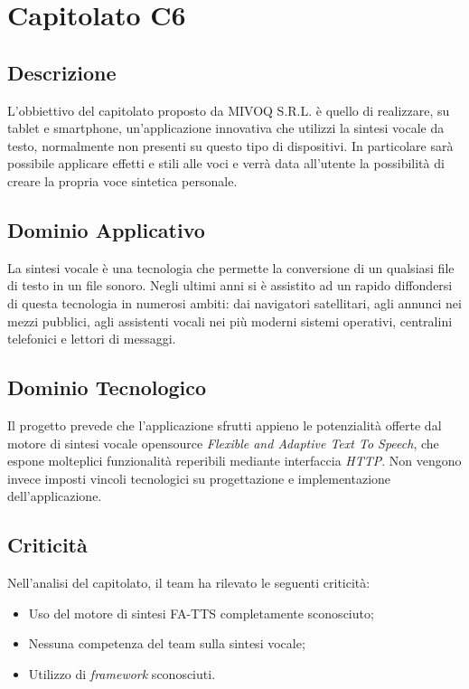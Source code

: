 \newpage
\section{Capitolato C6}
\subsection{Descrizione}
L’obbiettivo del capitolato proposto da MIVOQ S.R.L. è quello di realizzare, su tablet e smartphone, un’applicazione innovativa che utilizzi la sintesi vocale da testo, normalmente non presenti su questo tipo di dispositivi. In particolare sarà possibile applicare effetti e stili alle voci e verrà data all’utente la possibilità di creare la propria voce sintetica personale.

\subsection{Dominio Applicativo}
La sintesi vocale è una tecnologia che permette la conversione di un qualsiasi file di testo in un file sonoro. Negli ultimi anni si è assistito ad un rapido diffondersi di questa tecnologia in numerosi ambiti: dai navigatori satellitari, agli annunci nei mezzi pubblici, agli assistenti vocali nei più moderni sistemi operativi, centralini telefonici e lettori di messaggi.

\subsection{Dominio Tecnologico}
Il progetto prevede che l’applicazione sfrutti appieno le potenzialità offerte dal motore di sintesi vocale opensource \textit{Flexible and Adaptive Text To Speech}, che espone molteplici funzionalità reperibili mediante interfaccia \textit{HTTP}. Non vengono invece imposti vincoli tecnologici su progettazione e implementazione dell’applicazione.

\subsection{Criticità}
Nell'analisi del capitolato, il team ha rilevato le seguenti criticità:
\begin{itemize}
\item Uso del motore di sintesi FA-TTS completamente sconosciuto;
\item Nessuna competenza del team sulla sintesi vocale;
\item Utilizzo di \textit{framework} sconosciuti.
\end{itemize}

